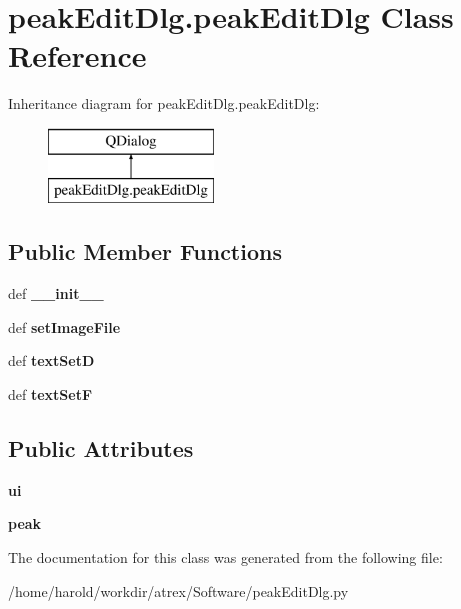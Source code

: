 \hypertarget{classpeakEditDlg_1_1peakEditDlg}{\section{peak\-Edit\-Dlg.\-peak\-Edit\-Dlg Class Reference}
\label{classpeakEditDlg_1_1peakEditDlg}
}
Inheritance diagram for peak\-Edit\-Dlg.\-peak\-Edit\-Dlg\-:\begin{figure}[H]
\begin{center}
\leavevmode
\includegraphics[height=2.000000cm]{classpeakEditDlg_1_1peakEditDlg}
\end{center}
\end{figure}
\subsection*{Public Member Functions}
\begin{DoxyCompactItemize}
\item 
\hypertarget{classpeakEditDlg_1_1peakEditDlg_a3a89be502d41175fb5b75fd419715096}{def {\bfseries \-\_\-\-\_\-init\-\_\-\-\_\-}}\label{classpeakEditDlg_1_1peakEditDlg_a3a89be502d41175fb5b75fd419715096}

\item 
\hypertarget{classpeakEditDlg_1_1peakEditDlg_ab11967324093e3350fe404fa29e255c1}{def {\bfseries set\-Image\-File}}\label{classpeakEditDlg_1_1peakEditDlg_ab11967324093e3350fe404fa29e255c1}

\item 
\hypertarget{classpeakEditDlg_1_1peakEditDlg_a2f577ff67c33813f4d803e5d85e62eb2}{def {\bfseries text\-Set\-D}}\label{classpeakEditDlg_1_1peakEditDlg_a2f577ff67c33813f4d803e5d85e62eb2}

\item 
\hypertarget{classpeakEditDlg_1_1peakEditDlg_a2dc064d39d748e09a70a7f6a236c7187}{def {\bfseries text\-Set\-F}}\label{classpeakEditDlg_1_1peakEditDlg_a2dc064d39d748e09a70a7f6a236c7187}

\end{DoxyCompactItemize}
\subsection*{Public Attributes}
\begin{DoxyCompactItemize}
\item 
\hypertarget{classpeakEditDlg_1_1peakEditDlg_a0220ea9f1c4703a47098891c57e1da1f}{{\bfseries ui}}\label{classpeakEditDlg_1_1peakEditDlg_a0220ea9f1c4703a47098891c57e1da1f}

\item 
\hypertarget{classpeakEditDlg_1_1peakEditDlg_abd94cfb1dd7a9ed84e1955b100a0be78}{{\bfseries peak}}\label{classpeakEditDlg_1_1peakEditDlg_abd94cfb1dd7a9ed84e1955b100a0be78}

\end{DoxyCompactItemize}


The documentation for this class was generated from the following file\-:\begin{DoxyCompactItemize}
\item 
/home/harold/workdir/atrex/\-Software/peak\-Edit\-Dlg.\-py\end{DoxyCompactItemize}
